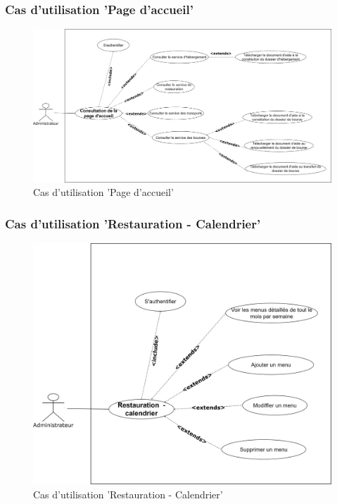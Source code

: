 \subsubsection*{Cas d'utilisation 'Page d'accueil'}
\begin{figure}[H]
    \centering
    \includegraphics[scale=0.09]{ACR/Diagrammes/accueil.jpg}
    \caption{Cas d'utilisation 'Page d'accueil'}
\end{figure}

\subsubsection*{Cas d'utilisation 'Restauration - Calendrier'}
\begin{figure}[H]
    \centering
    \includegraphics[scale=0.1]{ACR/Diagrammes/Restauration - calendrier.jpg}
    \caption{Cas d'utilisation 'Restauration - Calendrier'}
\end{figure}

